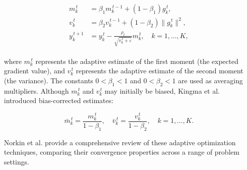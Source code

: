 \begin{eqnarray}
    \label{adam-update-rule:eq}
    \begin{aligned}
        m_k^{\,t} &= \beta_1 m_k^{\,t-1} + (1 - \beta_1) g_k^{\,t}, \\
        v_k^{\,t} &= \beta_2 v_k^{\,t-1} + (1 - \beta_2) \|g_k^{\,t}\|^2, \\
        y_k^{\,t+1} &= y_k^{\,t} - \frac{\rho_t}{\sqrt{v_k^{\,t} + \varepsilon}} m_k^{\,t}, \quad k=1,\ldots,K,
    \end{aligned}
\end{eqnarray}

\noindent where $m_k^{\,t}$ represents the adaptive estimate of the first moment (the expected gradient value), and $v_k^{\,t}$ represents the adaptive estimate of the second moment (the variance). The constants $0 < \beta_1 < 1$ and $0 < \beta_2 < 1$ are used as averaging multipliers. Although $m_k^{\,t}$ and $v_k^{\,t}$ may initially be biased, Kingma et al. introduced bias-corrected estimates:

\begin{equation}
    \label{adam-corrected-estimations:eq}
    \bar{m}_k^{\,t} = \frac{m_k^{\,t}}{1 - \beta_1}, \quad \bar{v}_k^{\,t} = \frac{v_k^{\,t}}{1 - \beta_2}, \quad k=1,\ldots,K.
\end{equation}

Norkin et al. \cite{Norkin_Kozyriev_Norkin_2024} provide a comprehensive review of these adaptive optimization techniques, comparing their convergence properties across a range of problem settings.